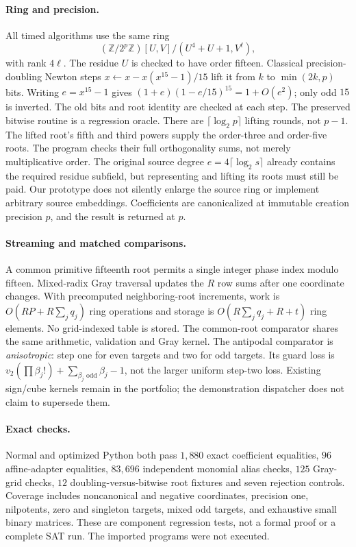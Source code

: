 \documentclass[11pt,letterpaper]{article}
\theoremstyle{remark}\newtheorem{remark}[theorem]{Remark}
\begin{document}
\paragraph{Ring and precision.}
All timed algorithms use the same ring
\[
 (\mathbb Z/2^p\mathbb Z)[U,V]/(U^4+U+1,V^\ell),
\]
with rank $4\ell$. The residue $U$ is checked to have order fifteen.
Classical precision-doubling Newton steps
$x\leftarrow x-x(x^{15}-1)/15$ lift it from $k$ to $\min(2k,p)$
bits. Writing $e=x^{15}-1$ gives
$(1+e)(1-e/15)^{15}=1+O(e^2)$; only odd $15$ is inverted.
The old bits and root identity are checked at each step. The preserved
bitwise routine is a regression oracle. There are $\lceil\log_2p\rceil$
lifting rounds, not $p-1$. The lifted root's fifth and third powers supply the order-three and order-five
roots. The program checks their full orthogonality sums, not merely
multiplicative order. The original source degree
$e=4\lceil\log_2s\rceil$ already contains the required residue subfield,
but representing and lifting its roots must still be paid. Our prototype
does not silently enlarge the source ring or implement arbitrary source
embeddings. Coefficients are canonicalized at immutable creation precision
$p$, and the result is returned at $p$.

\paragraph{Streaming and matched comparisons.}
A common primitive fifteenth root permits a single integer phase index
modulo fifteen. Mixed-radix Gray traversal updates the $R$ row sums after
one coordinate changes. With precomputed neighboring-root increments,
work is $O(RP+R\sum_jq_j)$ ring operations and storage is
$O(R\sum_jq_j+R+t)$ ring elements. No grid-indexed table is stored.
The common-root comparator shares the same arithmetic, validation and
Gray kernel. The antipodal comparator is \emph{anisotropic}: step one
for even targets and two for odd targets. Its guard loss is
$v_2(\prod\beta_j!)+\sum_{\beta_j\text{ odd}}\beta_j-1$, not the
larger uniform step-two loss. Existing sign/cube kernels remain in the
portfolio; the demonstration dispatcher does not claim to supersede them.

\paragraph{Exact checks.}
Normal and optimized Python both pass $1{,}880$ exact coefficient
equalities, $96$ affine-adapter equalities, $83{,}696$ independent monomial alias checks, $125$ Gray-grid
checks, $12$ doubling-versus-bitwise root fixtures and seven rejection controls. Coverage
includes noncanonical and negative coordinates, precision one, nilpotents,
zero and singleton targets, mixed odd targets, and exhaustive small binary
matrices. These are component regression tests, not a formal proof or a
complete SAT run. The imported programs were not executed.
\end{document}
